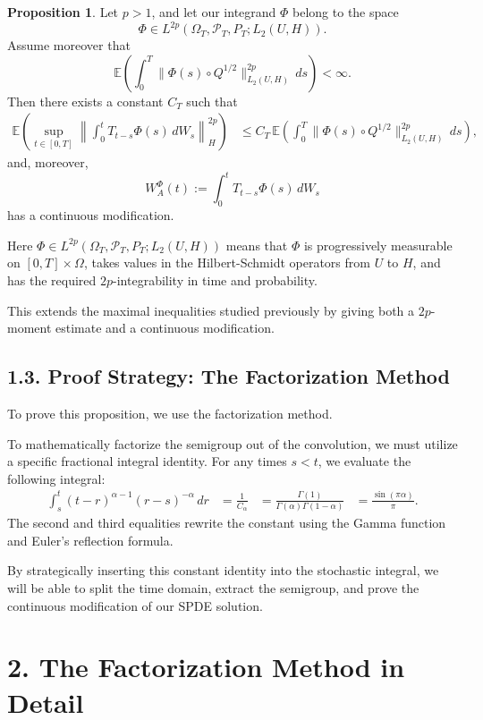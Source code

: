 \documentclass[11pt]{article}
\theoremstyle{definition}
\newtheorem{proposition}{Proposition}
\theoremstyle{remark}
\begin{document}
\begin{proposition}
Let \(p>1\), and let our integrand \(\Phi\) belong to the space
\[
\Phi\in L^{2p}(\Omega_T,\mathcal P_T,P_T;L_2(U,H)).
\]
Assume moreover that
\[
\mathbb E\!\left(\int_0^T \|\Phi(s)\circ Q^{1/2}\|_{L_2(U,H)}^{2p}\,ds\right)<\infty.
\]
Then there exists a constant \(C_T\) such that
\begin{align*}
\mathbb E\!\left(
\sup_{t\in[0,T]}
\left\|
\int_0^t T_{t-s}\Phi(s)\,dW_s
\right\|_H^{2p}
\right)
&\le
C_T\,
\mathbb E\!\left(\int_0^T \|\Phi(s)\circ Q^{1/2}\|_{L_2(U,H)}^{2p}\,ds\right),
\end{align*}
and, moreover,
\[
W_A^\Phi(t):=\int_0^t T_{t-s}\Phi(s)\,dW_s
\]
has a continuous modification.
\end{proposition}

Here \(\Phi\in L^{2p}(\Omega_T,\mathcal P_T,P_T;L_2(U,H))\) means that \(\Phi\) is progressively measurable on \([0,T]\times\Omega\), takes values in the Hilbert-Schmidt operators from \(U\) to \(H\), and has the required \(2p\)-integrability in time and probability.

This extends the maximal inequalities studied previously by giving both a \(2p\)-moment estimate and a continuous modification.

\subsection*{1.3. Proof Strategy: The Factorization Method}
To prove this proposition, we use the factorization method.

To mathematically factorize the semigroup out of the convolution, we must utilize a specific fractional integral identity. For any times \(s<t\), we evaluate the following integral:
\begin{align*}
\int_s^t (t-r)^{\alpha-1}(r-s)^{-\alpha}\,dr
&=
\frac{1}{C_\alpha}
&=
\frac{\Gamma(1)}{\Gamma(\alpha)\Gamma(1-\alpha)}
&=
\frac{\sin(\pi\alpha)}{\pi}.
\end{align*}
The second and third equalities rewrite the constant using the Gamma function and Euler's reflection formula.

By strategically inserting this constant identity into the stochastic integral, we will be able to split the time domain, extract the semigroup, and prove the continuous modification of our SPDE solution.

\section*{2. The Factorization Method in Detail}
\end{document}
